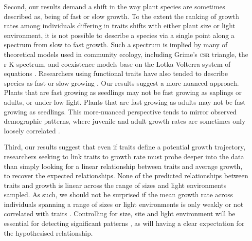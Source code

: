 \documentclass[a4paper,11pt]{article}
\begin{document}

Second, our results demand a shift in the way plant species are sometimes described as, being of fast or slow growth. To the extent the ranking of growth rates among individuals differing in traits shifts with either plant size or light environment, it is not possible to describe a species via a single point along a spectrum from slow to fast growth. Such a spectrum is implied by many of theoretical models used in community ecology, including Grime's \textsc{csr} triangle, the r-K spectrum, and coexistence models base on the Lotka-Volterra system of equations \citep[e.g.][]{Grime-1977,Chesson-2000}. Researchers using functional traits have also tended to describe species as fast or slow growing \citep[e.g.][]{Adler-2014, Diaz-2016}. Our results suggest a more-nuanced approach. Plants that are fast growing as seedlings may not be fast growing as saplings or adults, or under low light. Plants that are fast growing as adults may not be fast growing as seedlings. This more-nuanced perspective tends to mirror observed demographic patterns, where juvenile and adult growth rates are sometimes only loosely correlated \citep{Rees-2001}.

Third, our results suggest that even if traits define a potential growth trajectory, researchers seeking to link traits to growth rate must probe deeper into the data than simply looking for a linear relationship between traits and average growth, to recover the expected relationships. None of the predicted relationships between traits and growth is linear across the range of sizes and light environments sampled. As such, we should not be surprised if the mean growth rate across individuals spanning a range of sizes or light environments is only weakly or not correlated with traits \citep[e.g.][]{Poorter-2008,Paine-2015}. Controlling for size, site and light environment will be essential for detecting significant patterns \citep[e.g.][]{Gibert-2016}, as will having a clear expectation for the hypothesised relationship.
\end{document}
